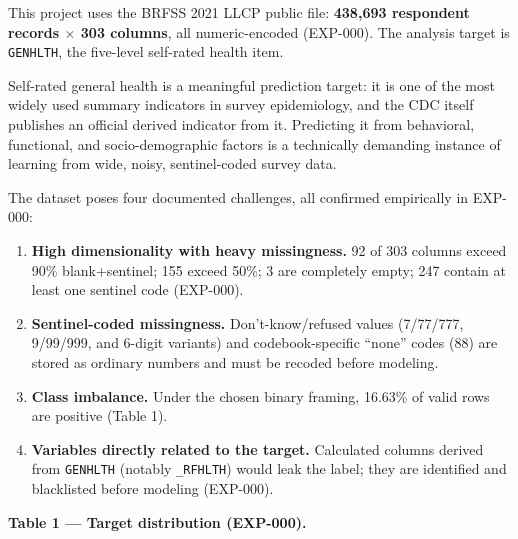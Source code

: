 \documentclass[11pt,a4paper]{article}
\providecommand{\tightlist}{\setlength{\itemsep}{2pt}\setlength{\parskip}{0pt}}
\begin{document}
This project uses the BRFSS 2021 LLCP public file: \textbf{438,693
respondent records $\times$ 303 columns}, all numeric-encoded (EXP-000). The
analysis target is \texttt{GENHLTH}, the five-level self-rated health
item.

Self-rated general health is a meaningful prediction target: it is one
of the most widely used summary indicators in survey epidemiology, and
the CDC itself publishes an official derived indicator from it.
Predicting it from behavioral, functional, and socio-demographic factors
is a technically demanding instance of learning from wide, noisy,
sentinel-coded survey data.

The dataset poses four documented challenges, all confirmed empirically
in EXP-000:

\begin{enumerate}
\def\labelenumi{\arabic{enumi}.}
\tightlist
\item
  \textbf{High dimensionality with heavy missingness.} 92 of 303 columns
  exceed 90\% blank+sentinel; 155 exceed 50\%; 3 are completely empty;
  247 contain at least one sentinel code (EXP-000).
\item
  \textbf{Sentinel-coded missingness.} Don't-know/refused values
  (7/77/777, 9/99/999, and 6-digit variants) and codebook-specific
  ``none'' codes (88) are stored as ordinary numbers and must be recoded
  before modeling.
\item
  \textbf{Class imbalance.} Under the chosen binary framing, 16.63\% of
  valid rows are positive (Table 1).
\item
  \textbf{Variables directly related to the target.} Calculated columns
  derived from \texttt{GENHLTH} (notably \texttt{\_RFHLTH}) would leak
  the label; they are identified and blacklisted before modeling
  (EXP-000).
\end{enumerate}

\textbf{Table 1 --- Target distribution (EXP-000).}
\end{document}
